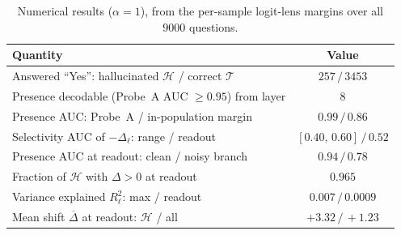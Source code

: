 \documentclass[11pt]{article}
\begin{document}
\begin{table}[H]
  \centering
  \begin{tabular}{lc}
    \toprule
    Quantity & Value \\
    \midrule
    Answered ``Yes'': hallucinated $\mathcal{H}$ / correct $\mathcal{T}$ & $257\,/\,3453$ \\
    Presence decodable (Probe~A AUC $\ge 0.95$) from layer & $8$ \\
    Presence AUC: Probe~A / in-population margin & $0.99\,/\,0.86$ \\
    Selectivity AUC of $-\Delta_\ell$: range / readout & $[0.40,\,0.60]\,/\,0.52$ \\
    Presence AUC at readout: clean / noisy branch & $0.94\,/\,0.78$ \\
    Fraction of $\mathcal{H}$ with $\Delta>0$ at readout & $0.965$ \\
    Variance explained $R^2_\ell$: max / readout & $0.007\,/\,0.0009$ \\
    Mean shift $\overline{\Delta}$ at readout: $\mathcal{H}$ / all & $+3.32\,/\,+1.23$ \\
    \bottomrule
  \end{tabular}
  \caption{Numerical results ($\alpha=1$), from the per-sample logit-lens margins over
  all $9000$ questions.}
  \label{tab:nums}
\end{table}
\end{document}
